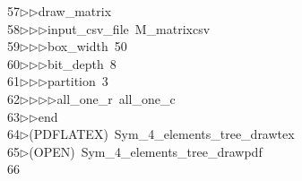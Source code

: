 \begin{tabbing}
57\>$\triangleright$\>$\triangleright$\>draw\_matrix\ \\[0pt]
58\>$\triangleright$\>$\triangleright$\>$\triangleright$\>input\_csv\_file\ M\_matrixcsv\ \\[0pt]
59\>$\triangleright$\>$\triangleright$\>$\triangleright$\>box\_width\ 50\ \\[0pt]
60\>$\triangleright$\>$\triangleright$\>$\triangleright$\>bit\_depth\ 8\ \\[0pt]
61\>$\triangleright$\>$\triangleright$\>$\triangleright$\>partition\ 3\ \\[0pt]
62\>$\triangleright$\>$\triangleright$\>$\triangleright$\>$\triangleright$\>all\_one\_r\ all\_one\_c\ \\[0pt]
63\>$\triangleright$\>$\triangleright$\>end\\[0pt]
64\>$\triangleright$\>(PDFLATEX)\ Sym\_4\_elements\_tree\_drawtex\\[0pt]
65\>$\triangleright$\>(OPEN)\ Sym\_4\_elements\_tree\_drawpdf\\[0pt]
66\>\end{tabbing}
